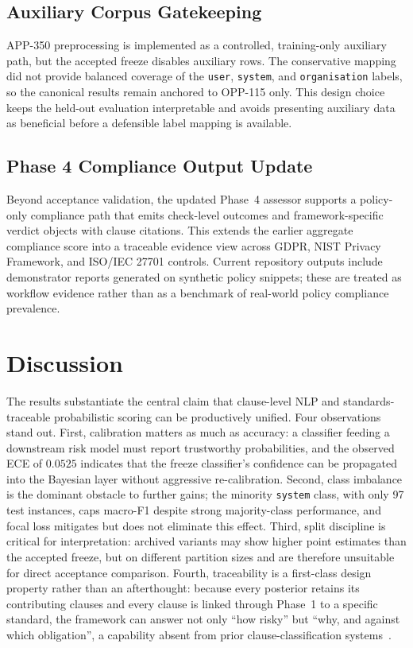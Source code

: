 \documentclass[conference]{IEEEtran}
\begin{document}
\subsection{Auxiliary Corpus Gatekeeping}
APP-350 preprocessing is implemented as a controlled, training-only auxiliary
path, but the accepted freeze disables auxiliary rows. The conservative
mapping did not provide balanced coverage of the \texttt{user}, \texttt{system},
and \texttt{organisation} labels, so the canonical results remain anchored to
OPP-115 only. This design choice keeps the held-out evaluation interpretable
and avoids presenting auxiliary data as beneficial before a defensible label
mapping is available.

\subsection{Phase 4 Compliance Output Update}
Beyond acceptance validation, the updated Phase~4 assessor supports a
policy-only compliance path that emits check-level outcomes and
framework-specific verdict objects with clause citations. This extends the
earlier aggregate compliance score into a traceable evidence view across GDPR,
NIST Privacy Framework, and ISO/IEC 27701 controls. Current repository outputs
include demonstrator reports generated on synthetic policy snippets; these are
treated as workflow evidence rather than as a benchmark of real-world policy
compliance prevalence.

\section{Discussion}\label{sec:discussion}
The results substantiate the central claim that clause-level NLP and
standards-traceable probabilistic scoring can be productively unified. Four
observations stand out. First, calibration matters as much as accuracy: a
classifier feeding a downstream risk model must report trustworthy
probabilities, and the observed ECE of $0.0525$ indicates that the freeze
classifier's confidence can be propagated into the Bayesian layer without
aggressive re-calibration. Second, class imbalance is the dominant obstacle to further
gains; the minority \texttt{system} class, with only 97 test instances,
caps macro-F1 despite strong majority-class performance, and focal loss
mitigates but does not eliminate this effect. Third, split discipline is
critical for interpretation: archived variants may show higher point
estimates than the accepted freeze, but on different partition sizes and are
therefore unsuitable for direct acceptance comparison. Fourth, traceability is a
first-class design property rather than an afterthought: because every
posterior retains its contributing clauses and every clause is linked through
Phase~1 to a specific standard, the framework can answer not only ``how risky''
but ``why, and against which obligation'', a capability absent from prior
clause-classification systems~\cite{harkous2018polisis,muralitharan2024privacybertlstm}.
\end{document}
